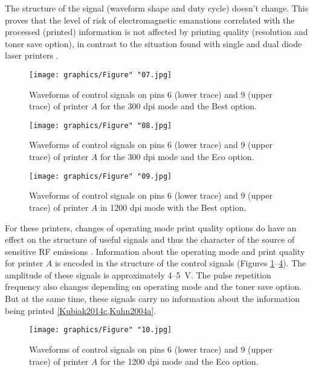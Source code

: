 \documentclass[10pt,a4paper]{article}
\begin{document}
The structure of the signal (waveform shape and duty cycle) doesn't change.
This proves that the level of risk of electromagnetic emanations correlated
with the processed (printed) information is not affected by printing quality
(resolution and toner save option), in contrast to the situation found with
single and dual diode laser printers \cite{Kubiak2016b}.

\begin{figure}[ht]
    \centering
    \texttt{[image: graphics/Figure" "07.jpg]}
    \caption{Waveforms of control signals on pins 6 (lower trace) and 9
        (upper trace) of printer $A$ for the 300 dpi mode and the Best
        option.}
    \label{figure:Figure_07}
\end{figure}

\begin{figure}[ht]
    \centering
    \texttt{[image: graphics/Figure" "08.jpg]}
    \caption{Waveforms of control signals on pins 6 (lower trace) and 9
        (upper trace) of printer $A$ for the 300 dpi mode and the Eco
        option.}
    \label{figure:Figure_08}
\end{figure}

\begin{figure}[ht]
    \centering
    \texttt{[image: graphics/Figure" "09.jpg]}
    \caption{Waveforms of control signals on pins 6 (lower trace) and 9
    (upper trace) of printer $A$ in 1200 dpi mode with the Best option.}
    \label{figure:Figure_09}
\end{figure}

For these printers, changes of operating mode print quality options do have
an effect on the structure of useful signals and thus the character of the
source of sensitive RF emissions \cite{Grzesiak2011a,Kubiak2015c}.
Information about the operating mode and print quality for printer $A$ is
encoded in the structure of the control signals (Figures
\ref{figure:Figure_07}--\ref{figure:Figure_10}). The amplitude of these
signals is approximately 4--\SI{5}{\volt}. The pulse repetition frequency
also changes depending on operating mode and the toner save option. But at
the same time, these signals carry no information about the information being
printed \ref{Kubiak2014c,Kuhn2004a}.

\begin{figure}[ht]
    \centering
    \texttt{[image: graphics/Figure" "10.jpg]}
    \caption{Waveforms of control signals on pins 6 (lower trace) and 9
    (upper trace) of printer $A$ for the 1200 dpi mode and the Eco option.}
    \label{figure:Figure_10}
\end{figure}
\end{document}
